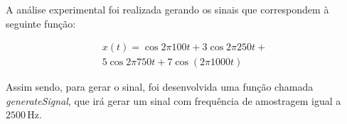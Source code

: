 A análise experimental foi realizada gerando os sinais que correspondem à seguinte função:

\begin{align}
    x(t) = \cos{2\pi 100 t} + 3 \cos{2\pi 250 t} + \\
    5 \cos{2\pi 750 t} + 7 \cos(2\pi 1000 t)    
\end{align}

Assim sendo, para gerar o sinal, foi desenvolvida uma função chamada \textit{generateSignal}, que irá gerar um sinal com frequência de amostragem igual a $2500\, \text{Hz}$.

